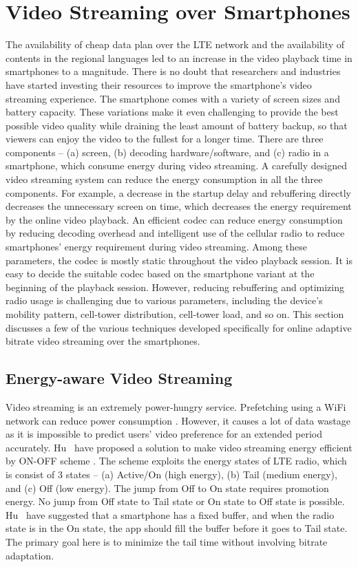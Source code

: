 \section{Video Streaming over Smartphones}
The availability of cheap data plan over the LTE network and the availability of contents in the regional languages led to an increase in the video playback time in smartphones to a magnitude. There is no doubt that researchers and industries have started investing their resources to improve the smartphone's video streaming experience. The smartphone comes with a variety of screen sizes and battery capacity. These variations make it even challenging to provide the best possible video quality while draining the least amount of battery backup, so that viewers can enjoy the video to the fullest for a longer time. There are three components -- (a) screen, (b) decoding hardware/software, and (c) radio in a smartphone, which consume energy during video streaming. A carefully designed video streaming system can reduce the energy consumption in all the three components. For example, a decrease in the startup delay and rebuffering directly decreases the unnecessary screen on time, which decreases the energy requirement by the online video playback. An efficient codec can reduce energy consumption by reducing decoding overhead and intelligent use of the cellular radio to reduce smartphones' energy requirement during video streaming. Among these parameters, the codec is mostly static throughout the video playback session. It is easy to decide the suitable codec based on the smartphone variant at the beginning of the playback session. However, reducing rebuffering and optimizing radio usage is challenging due to various parameters, including the device's mobility pattern, cell-tower distribution, cell-tower load, and so on. This section discusses a few of the various techniques developed specifically for online adaptive bitrate video streaming over the smartphones.

\subsection{Energy-aware Video Streaming}
Video streaming is an extremely power-hungry service. Prefetching using a WiFi network can reduce power consumption \cite{6681586,10.1145/2079296.2079321}. However, it causes a lot of data wastage as it is impossible to predict users' video preference for an extended period accurately. Hu \etal\ have proposed a solution to make video streaming energy efficient by ON-OFF scheme \cite{7218493}. The scheme exploits the energy states of LTE radio, which is consist of 3 states -- (a) Active/On (high energy), (b) Tail (medium energy), and (c) Off (low energy). The jump from Off to On state requires promotion energy. No jump from Off state to Tail state or On state to Off state is possible. Hu \etal\ have suggested that a smartphone has a fixed buffer, and when the radio state is in the On state, the app should fill the buffer before it goes to Tail state. The primary goal here is to minimize the tail time without involving bitrate adaptation.

